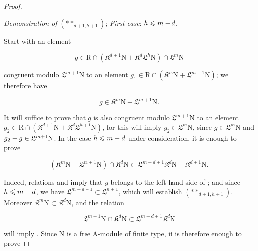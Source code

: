 \begin{proof}
\begin{env}[19.7.1.8]
\label{IV.19.7.1.8}
\emph{Demonstration of} $(**_{d+1,h+1})$; \emph{First case}: $h\leqslant m- d$.

Start with an element
\end{env}
\begin{env}[19.7.1.9]
\label{IV.19.7.1.9}
\[
  g\in\mathrm{R}\cap(\mathfrak K^{d+1}\mathrm{N}+\mathfrak K^d\mathfrak{L}^h\mathrm{N})\cap\mathfrak{L}^m\mathrm{N}
\]
\end{env}

congruent modulo $\mathfrak{L}^{m+1}\mathrm{N}$ to an element $g_1\in\mathrm{R}\cap(\mathfrak K^m\mathrm{N}+\mathfrak{L}^{m+1}\mathrm{N})$; we therefore have

\begin{env}[19.7.1.10]
\label{IV.19.7.1.10}
\[
  g\in\mathfrak{K}^m\mathrm{N}+\mathfrak{L}^{m+1}\mathrm{N}.
\]
\end{env}

It will suffice to prove that $g$ is also congruent modulo $\mathfrak{L}^{m+1}\mathrm{N}$ to an element $g_2\in\mathrm{R}\cap(\mathfrak K^{d+1}\mathrm{N}+\mathfrak K^d\mathfrak{L}^{h+1}\mathrm{N})$, for this will imply $g_2\in\mathfrak{L}^m\mathrm{N}$, since $g\in\mathfrak{L}^m\mathrm{N}$ and $g_2- g\in\mathfrak{L}^{m+1}\mathrm{N}$. In the case $h\leqslant m- d$ under consideration, it is enough to prove

\begin{env}[19.7.1.11]
\label{IV.19.7.1.11}
\[
  (\mathfrak K^m\mathrm{N}+\mathfrak{L}^{m+1}\mathrm{N})\cap\mathfrak K^d\mathrm{N}
  \subset\mathfrak{L}^{m-d+1}\mathfrak K^d\mathrm{N}+\mathfrak K^{d+1}\mathrm{N}.
\]
\end{env}

Indeed, relations  and  imply that $g$ belongs to the left-hand side of ; and since $h\leqslant m- d$, we have $\mathfrak{L}^{m-d+1}\subset\mathfrak{L}^{h+1}$, which will establish $(**_{d+1,h+1})$. Moreover $\mathfrak{K}^m\mathrm{N}\subset\mathfrak{K}^d\mathrm{N}$, and the relation

\begin{env}[19.7.1.12]
\label{IV.19.7.1.12}
\[
  \mathfrak{L}^{m+1}\mathrm{N}\cap\mathfrak{K}^d\mathrm{N}
  \subset\mathfrak{L}^{m-d+1}\mathfrak{K}^d\mathrm{N}
\]
\end{env}

will imply . Since $\mathrm{N}$ is a free $\mathrm{A}$-module of finite type, it is therefore enough to prove


\end{proof}

